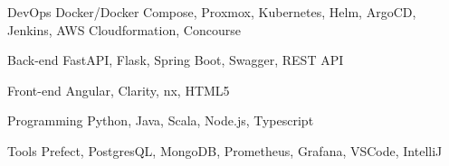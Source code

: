 

\begin{cvskills}

  \cvskill
    {DevOps} %
    {Docker/Docker Compose, Proxmox, Kubernetes, Helm, ArgoCD, Jenkins, AWS Cloudformation, Concourse} %

  \cvskill
    {Back-end} %
    {FastAPI, Flask, Spring Boot, Swagger, REST API} %

  \cvskill
    {Front-end} %
    {Angular, Clarity, nx, HTML5} %

  \cvskill
    {Programming} %
    {Python, Java, Scala, Node.js, Typescript} %
    
  \cvskill
    {Tools} %
    {Prefect, PostgresQL, MongoDB, Prometheus, Grafana, VSCode, IntelliJ} %

\end{cvskills}